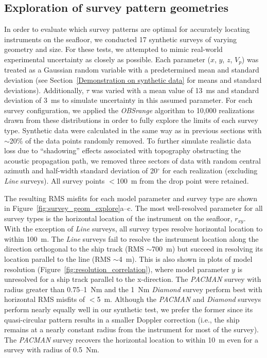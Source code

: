 \subsection{Exploration of survey pattern geometries} \label{sec:surv_geom_tests}

In order to evaluate which survey patterns are optimal for accurately locating instruments on the seafloor, we conducted 17 synthetic surveys of varying geometry and size. For these tests, we attempted to mimic real-world experimental uncertainty as closely as possible. Each parameter ($x$, $y$, $z$, $V_p$) was treated as a Gaussian random variable with a predetermined mean and standard deviation (see Section~\ref{Demonstration on synthetic data} for means and standard deviations). Additionally, $\tau$ was varied with a mean value of 13~ms and standard deviation of 3~ms to simulate uncertainty in this assumed parameter. For each survey configuration, we applied the \textit{OBSrange} algorithm to 10,000 realizations drawn from these distributions in order to fully explore the limits of each survey type. Synthetic data were calculated in the same way as in previous sections with $\sim$20\% of the data points randomly removed. To further simulate realistic data loss due to ``shadowing'' effects associated with topography obstructing the acoustic propagation path, we removed three sectors of data with random central azimuth and half-width standard deviation of 20$^{\circ}$ for each realization (excluding \textit{Line} surveys). All survey points $<$100~m from the drop point were retained.

The resulting RMS misfits for each model parameter and survey type are shown in Figure~\ref{fig:survey_geom_explore}a--c. The most well-resolved parameter for all survey types is the horizontal location of the instrument on the seafloor, $r_{xy}$. With the exception of \textit{Line} surveys, all survey types resolve horizontal location to within 100~m. The \textit{Line} surveys fail to resolve the instrument location along the direction orthogonal to the ship track (RMS $\sim$700~m) but succeed in resolving its location parallel to the line (RMS $\sim$4~m). This is also shown in plots of model resolution (Figure~\ref{fig:resolution_correlation}), where model parameter $y$ is unresolved for a ship track parallel to the x-direction. The \textit{PACMAN} survey with radius greater than 0.75--1~Nm and the 1~Nm \textit{Diamond} survey perform best with horizontal RMS misfits of $<$5~m. Although the \textit{PACMAN} and \textit{Diamond} surveys perform nearly equally well in our synthetic test, we prefer the former since its quasi-circular pattern results in a smaller Doppler correction (i.e., the ship remains at a nearly constant radius from the instrument for most of the survey). The \textit{PACMAN} survey recovers the horizontal location to within 10~m even for a survey with radius of 0.5~Nm.

